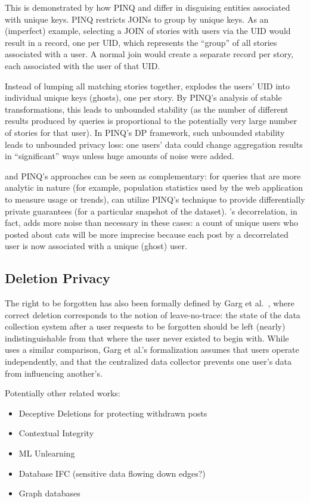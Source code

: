 This is demonstrated by how PINQ and \name differ in disguising entities associated with unique keys.
PINQ restricts JOINs to group by unique keys. As an (imperfect) example, selecting a JOIN of stories
with users via the UID would result in a record, one per UID, which represents the ``group'' of all
stories associated with a user. A normal join would create a separate record per story, each
associated with the user of that UID.

Instead of lumping all matching stories together, \name explodes the users' UID into individual
unique keys (ghosts), one per story. By PINQ's analysis of stable transformations, this leads to
unbounded stability (as the number of different results produced by queries is proportional to the
potentially very large number of stories for that user). In PINQ's DP framework, such unbounded
stability leads to unbounded privacy loss: one users' data could change aggregation results in
``significant'' ways unless huge amounts of noise were added.

\name and PINQ's approaches can be seen as complementary: for queries that are more analytic in nature (for example,
population statistics used by the web application to measure usage or trends), \name can utilize
PINQ's technique to provide differentially private guarantees (for a particular snapshot of the
dataset).  \name's decorrelation, in fact, adds more noise than necessary in these cases: a count
of unique users who posted about cats will be more imprecise because each post by a decorrelated
user is now associated with a unique (ghost) user.

\subsection{Deletion Privacy}
The right to be forgotten has also been formally defined by Garg et
al.~\cite{garg}, where correct deletion corresponds to the notion of
leave-no-trace: the state of the data collection system after a user requests to be forgotten should
be left (nearly) indistinguishable from that where the user never existed to begin with. While
\name uses a similar comparison, Garg et al.'s formalization assumes that users operate
independently, and that the centralized data collector prevents one user's data from influencing
another's.

Potentially other related works:
\begin{itemize}
    \item Deceptive Deletions for protecting withdrawn posts %
    \item Contextual Integrity
    \item ML Unlearning
    \item Database IFC (sensitive data flowing down edges?)
    \item Graph databases
\end{itemize}
\fi
